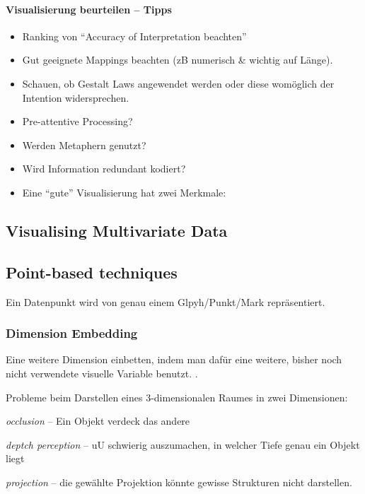 \documentclass[10pt]{article} %
\begin{document}
\paragraph{Visualisierung beurteilen -- Tipps}
\begin{itemize}
\item Ranking von ``Accuracy of Interpretation beachten''
\item Gut geeignete Mappings beachten (zB numerisch \& wichtig auf Länge).
\item Schauen, ob Gestalt Laws angewendet werden oder diese womöglich der
  Intention widersprechen.
\item Pre-attentive Processing?
\item Werden Metaphern genutzt?
  \item Wird Information redundant kodiert?
\item Eine ``gute'' Visualisierung hat zwei Merkmale:
\end{itemize}



\subsection{Visualising Multivariate Data}

\subsection{Point-based techniques}
Ein Datenpunkt wird von genau einem Glpyh/Punkt/Mark repräsentiert. 

\subsubsection{Dimension Embedding}
Eine weitere Dimension {einbetten}, indem man dafür eine
weitere, bisher noch nicht verwendete visuelle Variable benutzt. 
.

Probleme beim Darstellen eines 3-dimensionalen Raumes in zwei
Dimensionen:
\begin{cptitemize} 
 	 \item \textit{occlusion} -- Ein Objekt verdeck das andere
 	 \item \textit{deptch perception} -- uU schwierig auszumachen, in
 	 welcher Tiefe genau ein Objekt liegt
 	 \item \textit{projection} -- die gewählte Projektion könnte
 	 gewisse Strukturen nicht darstellen.
\end{cptitemize} 
\end{document}
